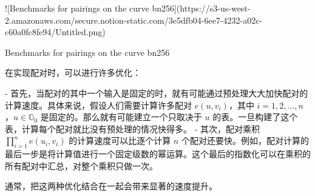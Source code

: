 ![Benchmarks for pairings on the curve bn256](https://s3-us-west-2.amazonaws.com/secure.notion-static.com/3e5dfb04-6ee7-4232-a02c-c60a0fc8fe94/Untitled.png)

Benchmarks for pairings on the curve bn256

在实现配对时，可以进行许多优化：

- 首先，当配对的其中一个输入是固定的时，就有可能通过预处理大大加快配对的计算速度。具体来说，假设人们需要计算许多配对 $e(u,v_i)$，其中 $i=1,2,\dots,n$，$u\in\mathbb{G}_0$ 是固定的。那么就有可能建立一个只取决于 $u$ 的表。一旦构建了这个表，计算每个配对就比没有预处理的情况快得多。
- 其次，配对乘积 $\prod_{i=1}^ne(u_i,v_i)$ 的计算速度可以比逐个计算 $n$ 个配对还要快。例如，配对计算的最后一步是将计算值进行一个固定级数的幂运算。这个最后的指数化可以在乘积的所有配对中汇总，对整个乘积只做一次。

通常，把这两种优化结合在一起会带来显著的速度提升。